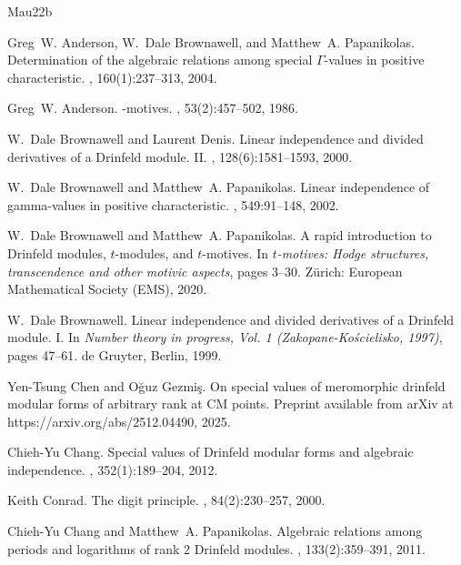 \documentclass[10pt,a4paper]{amsart}
\theoremstyle{plain} %
\theoremstyle{definition}
\theoremstyle{remark}
\numberwithin{equation}{subsection}
\begin{document}
%
%
\def\cprime{$'$}
\begin{thebibliography}{Mau22b}

Greg~W. Anderson, W.~Dale Brownawell, and Matthew~A. Papanikolas.
\newblock Determination of the algebraic relations among special
  {$\Gamma$}-values in positive characteristic.
, 160(1):237--313, 2004.

Greg~W. Anderson.
-motives.
, 53(2):457--502, 1986.

W.~Dale Brownawell and Laurent Denis.
\newblock Linear independence and divided derivatives of a {D}rinfeld module.
  {II}.
, 128(6):1581--1593, 2000.

W.~Dale Brownawell and Matthew~A. Papanikolas.
\newblock Linear independence of gamma-values in positive characteristic.
, 549:91--148, 2002.

W.~Dale Brownawell and Matthew~A. Papanikolas.
\newblock A rapid introduction to {Drinfeld} modules, {{\(t\)}}-modules, and
  {{\(t\)}}-motives.
\newblock In {\em \(t\)-motives: Hodge structures, transcendence and other
  motivic aspects}, pages 3--30. Z{\"u}rich: European Mathematical Society
  (EMS), 2020.

W.~Dale Brownawell.
\newblock Linear independence and divided derivatives of a {D}rinfeld module.
  {I}.
\newblock In {\em Number theory in progress, {V}ol. 1
  ({Z}akopane-{K}o\'scielisko, 1997)}, pages 47--61. de Gruyter, Berlin, 1999.

Yen-Tsung Chen and Oğuz Gezmiş.
\newblock On special values of meromorphic drinfeld modular forms of arbitrary
  rank at \uppercase{CM} points.
\newblock Preprint available from arXiv at https://arxiv.org/abs/2512.04490,
  2025.

Chieh-Yu Chang.
\newblock Special values of {Drinfeld} modular forms and algebraic
  independence.
, 352(1):189--204, 2012.

Keith Conrad.
\newblock The digit principle.
, 84(2):230--257, 2000.

Chieh-Yu Chang and Matthew~A. Papanikolas.
\newblock Algebraic relations among periods and logarithms of rank 2 {Drinfeld}
  modules.
, 133(2):359--391, 2011.


\end{thebibliography}
\end{document}
